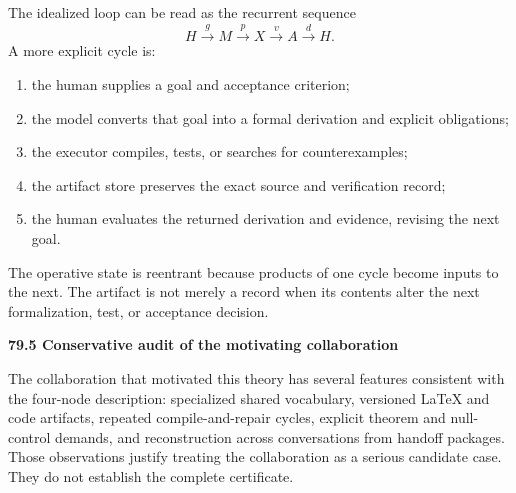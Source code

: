 \documentclass[11pt,letterpaper]{article}
\newcommand{\subtopic}[1]{%
 \vspace{0.45em}
 {\bfseries\color{AccentColor} #1\par}
}
\theoremstyle{plain}
\theoremstyle{definition}
\begin{document}
The idealized loop can be read as the recurrent sequence
\[
\boxed{
H\xrightarrow{g}M
\xrightarrow{p}X
\xrightarrow{v}A
\xrightarrow{d}H.
}
\]
A more explicit cycle is:
\begin{enumerate}
\item the human supplies a goal and acceptance criterion;
\item the model converts that goal into a formal derivation and explicit
 obligations;
\item the executor compiles, tests, or searches for counterexamples;
\item the artifact store preserves the exact source and verification record;
\item the human evaluates the returned derivation and evidence, revising the
 next goal.
\end{enumerate}
The operative state is reentrant because products of one cycle become inputs to
the next. The artifact is not merely a record when its contents alter the next
formalization, test, or acceptance decision.

\subtopic{79.5 Conservative audit of the motivating collaboration}

The collaboration that motivated this theory has several features consistent
with the four-node description: specialized shared vocabulary, versioned
LaTeX and code artifacts, repeated compile-and-repair cycles, explicit theorem
and null-control demands, and reconstruction across conversations from handoff
packages. Those observations justify treating the collaboration as a serious
candidate case. They do not establish the complete certificate.
\end{document}
